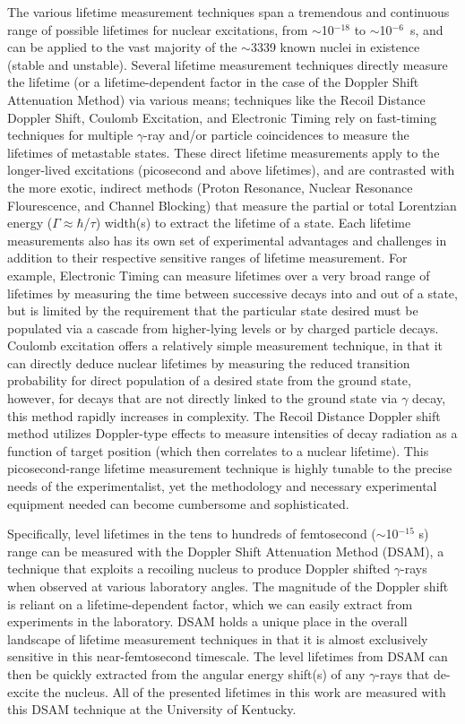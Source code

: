 The various lifetime measurement techniques span a tremendous and continuous range of possible lifetimes for nuclear excitations, from $\sim$10$^{-18}$ to $\sim$10$^{-6}$~s, and can be applied to the vast majority of the $\sim$3339 known nuclei in existence (stable and unstable). Several lifetime measurement techniques directly measure the lifetime (or a lifetime-dependent factor in the case of the Doppler Shift Attenuation Method) via various means; techniques like the Recoil Distance Doppler Shift, Coulomb Excitation, and Electronic Timing rely on fast-timing techniques for multiple $\gamma$-ray and/or particle coincidences to measure the lifetimes of metastable states. These direct lifetime measurements apply to the longer-lived excitations (picosecond and above lifetimes), and are contrasted with the more exotic, indirect methods (Proton Resonance, Nuclear Resonance Flourescence, and Channel Blocking) that measure the partial or total Lorentzian energy ($\Gamma\approx\hbar$/$\tau$) width(s) to extract the lifetime of a state. Each lifetime measurements also has its own set of experimental advantages and challenges in addition to their respective sensitive ranges of lifetime measurement. For example, Electronic Timing can measure lifetimes over a very broad range of lifetimes by measuring the time between successive decays into and out of a state, but is limited by the requirement that the particular state desired must be populated via a cascade from higher-lying levels or by charged particle decays. Coulomb excitation offers a relatively simple measurement technique, in that it can directly deduce nuclear lifetimes by measuring the reduced transition probability for direct population of a desired state from the ground state, however, for decays that are not directly linked to the ground state via $\gamma$ decay, this method rapidly increases in complexity. The Recoil Distance Doppler shift method utilizes Doppler-type effects to measure intensities of decay radiation as a function of target position (which then correlates to a nuclear lifetime). This picosecond-range lifetime measurement technique is highly tunable to the precise needs of the experimentalist, yet the methodology and necessary experimental equipment needed can become cumbersome and sophisticated.

Specifically, level lifetimes in the tens to hundreds of femtosecond ($\sim$10$^{-15}$ s) range can be measured with the Doppler Shift Attenuation Method (DSAM), a technique that exploits a recoiling nucleus to produce Doppler shifted $\gamma$-rays when observed at various laboratory angles. The magnitude of the Doppler shift is reliant on a lifetime-dependent factor, which we can easily extract from experiments in the laboratory. DSAM holds a unique place in the overall landscape of lifetime measurement techniques in that it is almost exclusively sensitive in this near-femtosecond timescale. The level lifetimes from DSAM can then be quickly extracted from the angular energy shift(s) of any $\gamma$-rays that de-excite the nucleus.  All of the presented lifetimes in this work are measured with this DSAM technique at the University of Kentucky.

